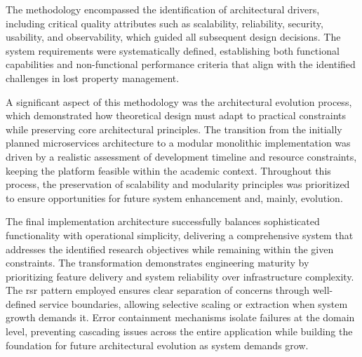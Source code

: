 The methodology encompassed the identification of architectural drivers, including critical quality attributes such as scalability, reliability, security, usability, and observability, which guided all subsequent design decisions. The system requirements were systematically defined, establishing both functional capabilities and non-functional performance criteria that align with the identified challenges in lost property management.

A significant aspect of this methodology was the architectural evolution process, which demonstrated how theoretical design must adapt to practical constraints while preserving core architectural principles. The transition from the initially planned microservices architecture to a modular monolithic implementation was driven by a realistic assessment of development timeline and resource constraints, keeping the platform feasible within the academic context. Throughout this process, the preservation of scalability and modularity principles was prioritized to ensure opportunities for future system enhancement and, mainly, evolution.

The final implementation architecture successfully balances sophisticated functionality with operational simplicity, delivering a comprehensive system that addresses the identified research objectives while remaining within the given constraints. The transformation demonstrates engineering maturity by prioritizing feature delivery and system reliability over infrastructure complexity. The \ac{rsr} pattern employed ensures clear separation of concerns through well-defined service boundaries, allowing selective scaling or extraction when system growth demands it. Error containment mechanisms isolate failures at the domain level, preventing cascading issues across the entire application while building the foundation for future architectural evolution as system demands grow.
